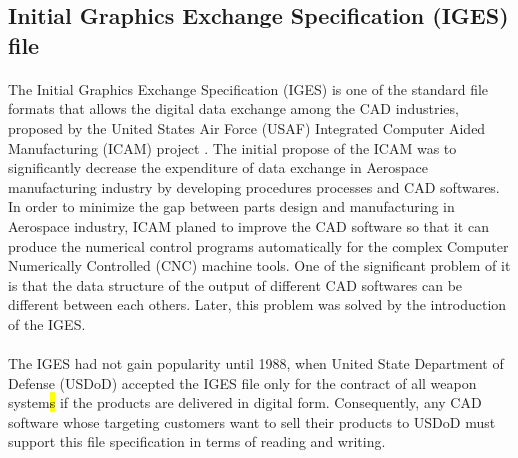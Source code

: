 \subsection{Initial Graphics Exchange Specification (IGES) file}
\label{lr_sec:IGES}
\paragraph{}
The Initial Graphics Exchange Specification (IGES) is one of the standard file formats that allows the digital data exchange among the CAD industries, proposed by the United States Air Force (USAF) Integrated Computer Aided Manufacturing (ICAM) project \citep{uspro2006}.
The initial propose of the ICAM was to significantly decrease the expenditure of data exchange in Aerospace manufacturing industry by developing procedures processes and CAD softwares.
In order to minimize the gap between parts design and manufacturing in Aerospace industry, ICAM planed to improve the CAD software so that it can produce the numerical control programs automatically for the complex Computer Numerically Controlled (CNC) machine tools.
One of the significant problem of it is that the data structure of the output of different CAD softwares can be different between each others.
Later, this problem was solved by the introduction of the IGES.
\paragraph{}
The IGES had not gain popularity until 1988, when United State Department of Defense (USDoD) accepted the IGES file only for the contract of all weapon system\hl{s} if the products are delivered in digital form.
Consequently, any CAD software whose targeting customers want to sell their products to USDoD must support this file specification in terms of reading and writing.



